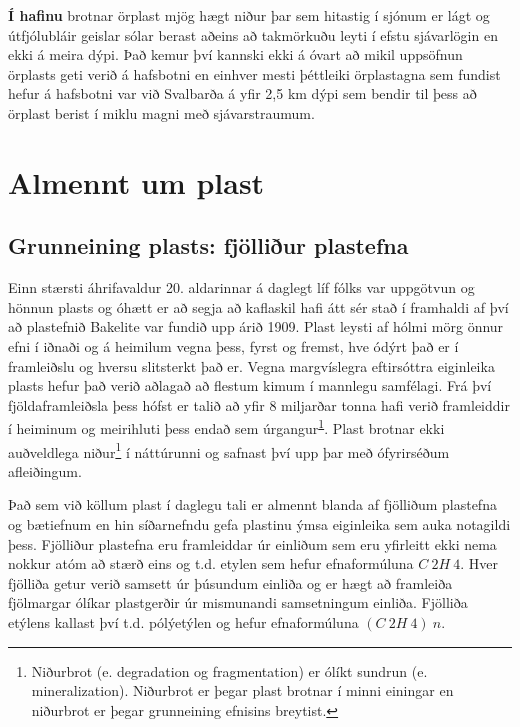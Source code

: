 \documentclass[icelandic,]{book}
\let\rmarkdownfootnote\footnote%
\def\footnote{\protect\rmarkdownfootnote}
\begin{document}
\textbf{Í hafinu} brotnar örplast mjög hægt niður þar sem hitastig í sjónum er lágt og útfjólubláir geislar sólar berast aðeins að takmörkuðu leyti í efstu sjávarlögin en ekki á meira dýpi. Það kemur því kannski ekki á óvart að mikil uppsöfnun örplasts geti verið á hafsbotni en einhver mesti þéttleiki örplastagna sem fundist hefur á hafsbotni var við Svalbarða á yfir 2,5 km dýpi sem bendir til þess að örplast berist í miklu magni með sjávarstraumum.

\hypertarget{almennt-um-plast}{%
\chapter{Almennt um plast}\label{almennt-um-plast}}

\hypertarget{grunneining-plasts-fjolliur-plastefna}{%
\section*{Grunneining plasts: fjölliður plastefna}\label{grunneining-plasts-fjolliur-plastefna}}

Einn stærsti áhrifavaldur 20. aldarinnar á daglegt líf fólks var uppgötvun og hönnun plasts og óhætt er að segja að kaflaskil hafi átt sér stað í framhaldi af því að plastefnið Bakelite var fundið upp árið 1909. Plast leysti af hólmi mörg önnur efni í iðnaði og á heimilum vegna þess, fyrst og fremst, hve ódýrt það er í framleiðslu og hversu slitsterkt það er. Vegna margvíslegra eftirsóttra eiginleika plasts hefur það verið aðlagað að flestum kimum í mannlegu samfélagi. Frá því fjöldaframleiðsla þess hófst er talið að yfir 8 miljarðar tonna hafi verið framleiddir í heiminum og meirihluti þess endað sem úrgangur\textsuperscript{\protect\hyperlink{ref-geyer2017production}{1}}. Plast brotnar ekki auðveldlega niður\footnote{Niðurbrot (e. degradation og fragmentation) er ólíkt sundrun (e. mineralization). Niðurbrot er þegar plast brotnar í minni einingar en niðurbrot er þegar grunneining efnisins breytist.} í náttúrunni og safnast því upp þar með ófyrirséðum afleiðingum.

Það sem við köllum plast í daglegu tali er almennt blanda af fjölliðum plastefna og bætiefnum en hin síðarnefndu gefa plastinu ýmsa eiginleika sem auka notagildi þess. Fjölliður plastefna eru framleiddar úr einliðum sem eru yfirleitt ekki nema nokkur atóm að stærð eins og t.d. etylen sem hefur efnaformúluna \(C~2H~4\). Hver fjölliða getur verið samsett úr þúsundum einliða og er hægt að framleiða fjölmargar ólíkar plastgerðir úr mismunandi samsetningum einliða. Fjölliða etýlens kallast því t.d. pólýetýlen og hefur efnaformúluna \((C~2H~4)~n\).
\end{document}
